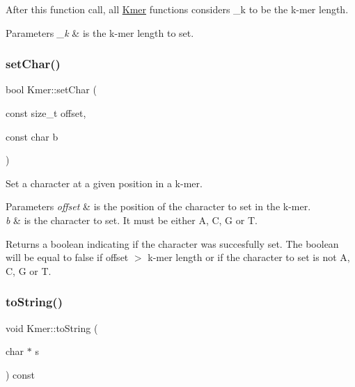 After this function call, all \hyperlink{classKmer}{Kmer} functions considers \+\_\+k to be the k-\/mer length. 
\begin{DoxyParams}{Parameters}
{\em \+\_\+k} & is the k-\/mer length to set. \\
\hline
\end{DoxyParams}
\mbox{\label{classKmer_acd1e99defb65ea71c7cf804d3f1e3dc4}} 
\subsubsection{\texorpdfstring{set\+Char()}{setChar()}}
{\footnotesize\ttfamily bool Kmer\+::set\+Char (\begin{DoxyParamCaption}\item[{const size\+\_\+t}]{offset,  }\item[{const char}]{b }\end{DoxyParamCaption})}



Set a character at a given position in a k-\/mer. 


\begin{DoxyParams}{Parameters}
{\em offset} & is the position of the character to set in the k-\/mer. \\
\hline
{\em b} & is the character to set. It must be either \textquotesingle{}A\textquotesingle{}, \textquotesingle{}C\textquotesingle{}, \textquotesingle{}G\textquotesingle{} or \textquotesingle{}T\textquotesingle{}. \\
\hline
\end{DoxyParams}
\begin{DoxyReturn}{Returns}
a boolean indicating if the character was succesfully set. The boolean will be equal to false if offset $>$ k-\/mer length or if the character to set is not \textquotesingle{}A\textquotesingle{}, \textquotesingle{}C\textquotesingle{}, \textquotesingle{}G\textquotesingle{} or \textquotesingle{}T\textquotesingle{}. 
\end{DoxyReturn}
\mbox{\label{classKmer_a69125d95f234312a670b970cd14d9ef3}} 
\subsubsection{\texorpdfstring{to\+String()}{toString()}\hspace{0.1cm}{\footnotesize\ttfamily [1/2]}}
{\footnotesize\ttfamily void Kmer\+::to\+String (\begin{DoxyParamCaption}\item[{char $\ast$}]{s }\end{DoxyParamCaption}) const}



